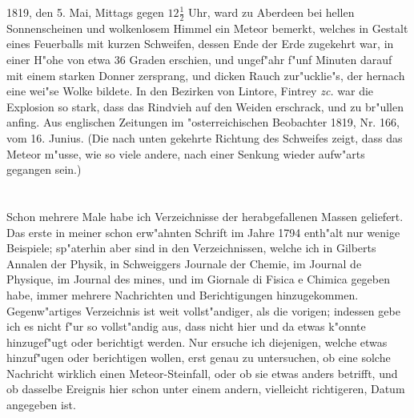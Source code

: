 \documentclass[a4paper, 11pt, oneside, polutonikogreek, german]{article}
\begin{document}
1819, den 5. Mai, Mittags gegen $\mathfrak{12\frac{1}{2}}$ Uhr, ward zu Aberdeen bei hellen Sonnenscheinen und wolkenlosem Himmel ein Meteor bemerkt, welches in Gestalt eines Feuerballs mit kurzen Schweifen, dessen Ende der Erde zugekehrt war, in einer H"ohe von etwa 36 Graden erschien, und ungef"ahr f"unf Minuten darauf mit einem starken Donner zersprang, und dicken Rauch zur"ucklie"s, der hernach eine wei"se Wolke bildete. In den Bezirken von Lintore, Fintrey \emph{zc.} war die Explosion so stark, dass das Rindvieh auf den Weiden erschrack, und zu br"ullen anfing. Aus englischen Zeitungen im "osterreichischen Beobachter 1819, Nr. 166, vom 16. Junius. (Die nach unten gekehrte Richtung des Schweifes zeigt, dass das Meteor m"usse, wie so viele andere, nach einer Senkung wieder aufw"arts gegangen sein.)
\clearpage
\section{}
\paragraph{}
\subsection{}
\paragraph{}
Schon mehrere Male habe ich Verzeichnisse der herabgefallenen Massen geliefert. Das erste in meiner schon erw"ahnten Schrift im Jahre 1794 enth"alt nur wenige Beispiele; sp"aterhin aber sind in den Verzeichnissen, welche ich in Gilberts Annalen der Physik, in Schweiggers Journale der Chemie, im Journal de Physique, im Journal des mines, und im Giornale di Fisica e Chimica gegeben habe, immer mehrere Nachrichten und Berichtigungen hinzugekommen. Gegenw"artiges Verzeichnis ist weit vollst"andiger, als die vorigen; indessen gebe ich es nicht f"ur so vollst"andig aus, dass nicht hier und da etwas k"onnte hinzugef"ugt oder berichtigt werden. Nur ersuche ich diejenigen, welche etwas hinzuf"ugen oder berichtigen wollen, erst genau zu untersuchen, ob eine solche Nachricht wirklich einen Meteor-Steinfall, oder ob sie etwas anders betrifft, und ob dasselbe Ereignis hier schon unter einem andern, vielleicht richtigeren, Datum angegeben ist.
\end{document}
